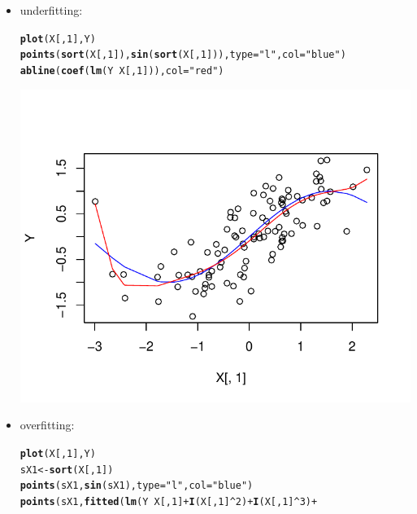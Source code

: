 \documentclass[a4paper]{article}
\makeatletter
\def\maxwidth{ %
  \ifdim\Gin@nat@width>\linewidth
    \linewidth
  \else
    \Gin@nat@width
  \fi
}
\newcommand{\hlnum}[1]{\textcolor[rgb]{0.686,0.059,0.569}{#1}}%
\newcommand{\hlstr}[1]{\textcolor[rgb]{0.192,0.494,0.8}{#1}}%
\newcommand{\hlopt}[1]{\textcolor[rgb]{0,0,0}{#1}}%
\newcommand{\hlstd}[1]{\textcolor[rgb]{0.345,0.345,0.345}{#1}}%
\newcommand{\hlkwb}[1]{\textcolor[rgb]{0.69,0.353,0.396}{#1}}%
\newcommand{\hlkwc}[1]{\textcolor[rgb]{0.333,0.667,0.333}{#1}}%
\newcommand{\hlkwd}[1]{\textcolor[rgb]{0.737,0.353,0.396}{\textbf{#1}}}%
\newenvironment{kframe}{%
 \def\at@end@of@kframe{}%
 \ifinner\ifhmode%
  \def\at@end@of@kframe{\end{minipage}}%
  \begin{minipage}{\columnwidth}%
 \fi\fi%
 \def\FrameCommand##1{\hskip\@totalleftmargin \hskip-\fboxsep
 \colorbox{shadecolor}{##1}\hskip-\fboxsep
     \hskip-\linewidth \hskip-\@totalleftmargin \hskip\columnwidth}%
 \MakeFramed {\advance\hsize-\width
   \@totalleftmargin\z@ \linewidth\hsize
   \@setminipage}}%
 {\par\unskip\endMakeFramed%
 \at@end@of@kframe}
\newenvironment{knitrout}{}{} %
\makeatother
\begin{document}
{\begin{enumerate}
\begin{itemize}
\item underfitting:
\begin{knitrout}
\color{fgcolor}\begin{kframe}
\begin{alltt}
\hlkwd{plot}\hlstd{(X[,}\hlnum{1}\hlstd{], Y)}
\hlkwd{points}\hlstd{(}\hlkwd{sort}\hlstd{(X[,}\hlnum{1}\hlstd{]),} \hlkwd{sin}\hlstd{(}\hlkwd{sort}\hlstd{(X[,}\hlnum{1}\hlstd{])),} \hlkwc{type}\hlstd{=}\hlstr{"l"}\hlstd{,} \hlkwc{col}\hlstd{=}\hlstr{"blue"}\hlstd{)}
\hlkwd{abline}\hlstd{(}\hlkwd{coef}\hlstd{(}\hlkwd{lm}\hlstd{(Y} \hlopt{~} \hlstd{X[,}\hlnum{1}\hlstd{])),} \hlkwc{col}\hlstd{=}\hlstr{"red"}\hlstd{)}
\end{alltt}
\end{kframe}
\includegraphics[width=\maxwidth]{figure/unnamed-chunk-4-1} 
\end{knitrout}
\item overfitting:
\begin{knitrout}
\color{fgcolor}\begin{kframe}
\begin{alltt}
\hlkwd{plot}\hlstd{(X[,}\hlnum{1}\hlstd{], Y)}
\hlstd{sX1} \hlkwb{<-} \hlkwd{sort}\hlstd{(X[,}\hlnum{1}\hlstd{])}
\hlkwd{points}\hlstd{(sX1,} \hlkwd{sin}\hlstd{(sX1),} \hlkwc{type}\hlstd{=}\hlstr{"l"}\hlstd{,} \hlkwc{col}\hlstd{=}\hlstr{"blue"}\hlstd{)}
\hlkwd{points}\hlstd{(sX1,} \hlkwd{fitted}\hlstd{(}\hlkwd{lm}\hlstd{(Y} \hlopt{~} \hlstd{X[,}\hlnum{1}\hlstd{]} \hlopt{+} \hlkwd{I}\hlstd{(X[,}\hlnum{1}\hlstd{]}\hlopt{^}\hlnum{2}\hlstd{)} \hlopt{+} \hlkwd{I}\hlstd{(X[,}\hlnum{1}\hlstd{]}\hlopt{^}\hlnum{3}\hlstd{)} \hlopt{+}

\end{alltt}
\end{kframe}
\end{knitrout}
\end{itemize}
\end{enumerate}}
\end{document}
